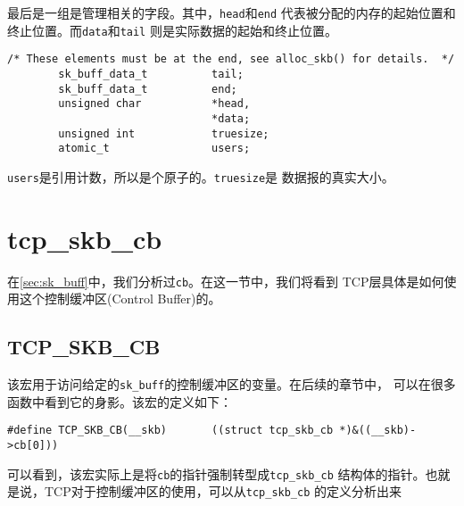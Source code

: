 \documentclass[11pt, a4paper,oneside]{book}
\theoremstyle{ocrenumbox}
\theoremstyle{purplenumbox}
\theoremstyle{blackbox}
\begin{document}
最后是一组是管理相关的字段。其中，\texttt{head}和\texttt{end}
代表被分配的内存的起始位置和终止位置。而\texttt{data}和\texttt{tail}
则是实际数据的起始和终止位置。
\begin{verbatim}
/* These elements must be at the end, see alloc_skb() for details.  */
        sk_buff_data_t          tail;
        sk_buff_data_t          end;
        unsigned char           *head,
                                *data;
        unsigned int            truesize;
        atomic_t                users;
\end{verbatim}
\texttt{users}是引用计数，所以是个原子的。\texttt{truesize}是
数据报的真实大小。

\section{tcp\_skb\_cb}
\label{sec:tcp_skb_cb}

在\ref{sec:sk_buff}中，我们分析过\texttt{cb}。在这一节中，我们将看到
TCP层具体是如何使用这个控制缓冲区(Control Buffer)的。

\subsection{TCP\_SKB\_CB}
\label{subsec:tcp_skb_cb}

该宏用于访问给定的\texttt{sk_buff}的控制缓冲区的变量。在后续的章节中，
可以在很多函数中看到它的身影。该宏的定义如下：

\begin{verbatim}
#define TCP_SKB_CB(__skb)       ((struct tcp_skb_cb *)&((__skb)->cb[0]))
\end{verbatim}

可以看到，该宏实际上是将\texttt{cb}的指针强制转型成\texttt{tcp_skb_cb}
结构体的指针。也就是说，TCP对于控制缓冲区的使用，可以从\texttt{tcp_skb_cb}
的定义分析出来
\end{document}
